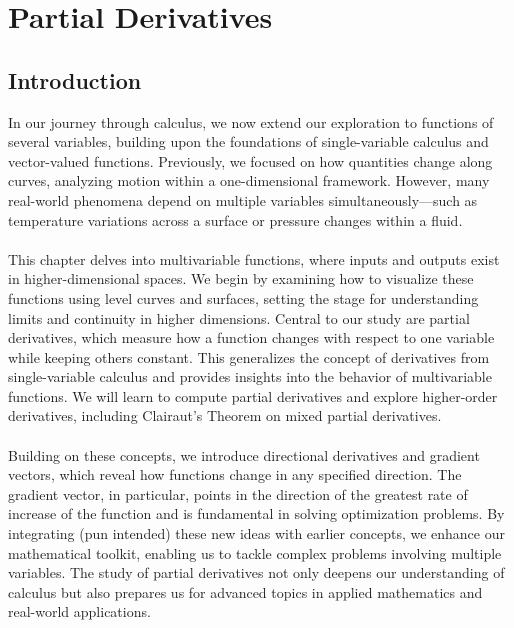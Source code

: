 
\chapter{Partial Derivatives}

\section*{Introduction}

In our journey through calculus, we now extend our exploration to functions of several variables, building upon the foundations of single-variable calculus and vector-valued functions. Previously, we focused on how quantities change along curves, analyzing motion within a one-dimensional framework. However, many real-world phenomena depend on multiple variables simultaneously—such as temperature variations across a surface or pressure changes within a fluid. \\ \\ This chapter delves into multivariable functions, where inputs and outputs exist in higher-dimensional spaces. We begin by examining how to visualize these functions using level curves and surfaces, setting the stage for understanding limits and continuity in higher dimensions. Central to our study are partial derivatives, which measure how a function changes with respect to one variable while keeping others constant. This generalizes the concept of derivatives from single-variable calculus and provides insights into the behavior of multivariable functions. We will learn to compute partial derivatives and explore higher-order derivatives, including Clairaut's Theorem on mixed partial derivatives. \\ \\ Building on these concepts, we introduce directional derivatives and gradient vectors, which reveal how functions change in any specified direction. The gradient vector, in particular, points in the direction of the greatest rate of increase of the function and is fundamental in solving optimization problems. By integrating (pun intended) these new ideas with earlier concepts, we enhance our mathematical toolkit, enabling us to tackle complex problems involving multiple variables. The study of partial derivatives not only deepens our understanding of calculus but also prepares us for advanced topics in applied mathematics and real-world applications.



\newpage 




